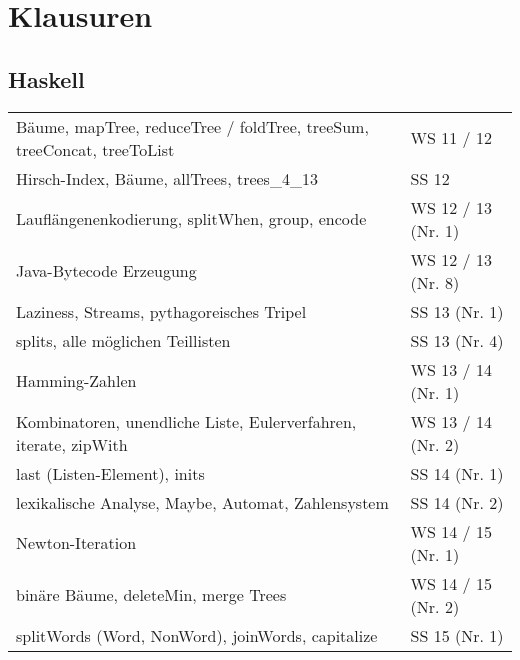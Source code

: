 \section{Klausuren}
\subsection{Haskell}
\begin{table}[h]
	\centering
	\label{my-label}
	\begin{tabular}{ll}
		Bäume, mapTree, reduceTree / foldTree, treeSum, treeConcat, treeToList
		& WS 11 / 12  \\
		
		Hirsch-Index, Bäume, allTrees, trees\_4\_13
		& SS 12 \\
		
		Lauflängenenkodierung, splitWhen, group, encode 
		& WS 12 / 13 (Nr. 1)\\
		
		Java-Bytecode Erzeugung 
		& WS 12 / 13 (Nr. 8)\\
		
		Laziness, Streams, pythagoreisches Tripel 
		& SS 13 (Nr. 1)\\
		
		splits, alle möglichen Teillisten 
		& SS 13 (Nr. 4)\\
		
		Hamming-Zahlen 
		& WS 13 / 14 (Nr. 1)\\
		
		Kombinatoren, unendliche Liste, Eulerverfahren, iterate, zipWith 
		& WS 13 / 14 (Nr. 2)\\
		
		last (Listen-Element), inits 
		& SS 14 (Nr. 1)\\
		
		lexikalische Analyse, Maybe, Automat, Zahlensystem 
		& SS 14 (Nr. 2)\\
		
		Newton-Iteration
		& WS 14 / 15 (Nr. 1) \\
		
		binäre Bäume, deleteMin, merge Trees
		& WS 14 / 15 (Nr. 2) \\
		
		splitWords (Word, NonWord), joinWords, capitalize
		& SS 15 (Nr. 1) \\
	\end{tabular}
\end{table}
~\\


